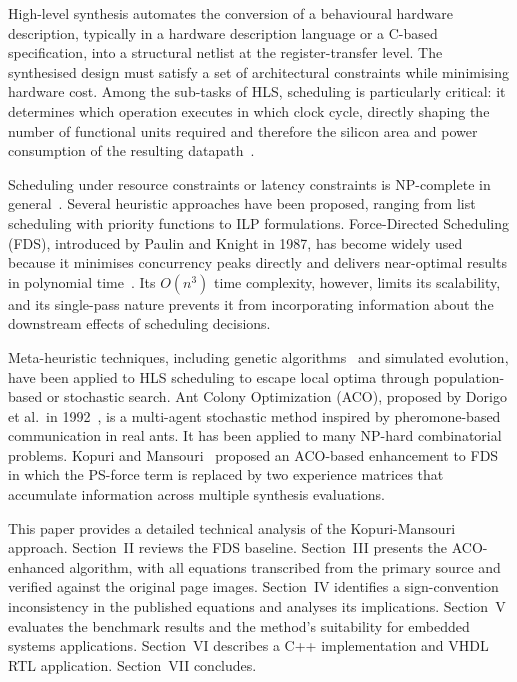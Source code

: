 \documentclass[conference]{IEEEtran}
\begin{document}
High-level synthesis automates the conversion of a behavioural hardware
description, typically in a hardware description language or a C-based
specification, into a structural netlist at the register-transfer level.
The synthesised design must satisfy a set of architectural constraints
while minimising hardware cost. Among the sub-tasks of HLS, scheduling
is particularly critical: it determines which operation executes in which
clock cycle, directly shaping the number of functional units required and
therefore the silicon area and power consumption of the resulting
datapath~\cite{kopuri2004aco}.

Scheduling under resource constraints or latency constraints is
NP-complete in general~\cite{paulin1987fds}. Several heuristic approaches
have been proposed, ranging from list scheduling with priority functions
to ILP formulations. Force-Directed Scheduling (FDS), introduced by
Paulin and Knight in 1987, has become widely used because it minimises
concurrency peaks directly and delivers near-optimal results in polynomial
time~\cite{paulin1987fds}. Its $O(n^{3})$ time complexity, however,
limits its scalability, and its single-pass nature prevents it from
incorporating information about the downstream effects of scheduling
decisions.

Meta-heuristic techniques, including genetic algorithms~\cite{heijligers1995}
and simulated evolution, have been applied to HLS scheduling to escape
local optima through population-based or stochastic search. Ant Colony
Optimization (ACO), proposed by Dorigo et al.\ in 1992~\cite{dorigo1992},
is a multi-agent stochastic method inspired by pheromone-based
communication in real ants. It has been applied to many NP-hard
combinatorial problems. Kopuri and Mansouri~\cite{kopuri2004aco} proposed
an ACO-based enhancement to FDS in which the PS-force term is replaced by
two experience matrices that accumulate information across multiple
synthesis evaluations.

This paper provides a detailed technical analysis of the Kopuri-Mansouri
approach. Section~II reviews the FDS baseline. Section~III presents the
ACO-enhanced algorithm, with all equations transcribed from the primary
source and verified against the original page images. Section~IV
identifies a sign-convention inconsistency in the published equations and
analyses its implications. Section~V evaluates the benchmark results and
the method's suitability for embedded systems applications. Section~VI
describes a C++ implementation and VHDL RTL application. Section~VII
concludes.
\end{document}
